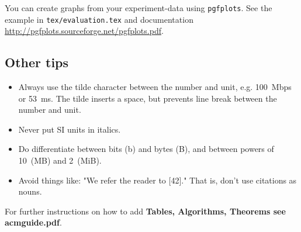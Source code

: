 You can create graphs from your experiment-data using \texttt{pgfplots}.
See the example in \texttt{tex/evaluation.tex} and documentation \url{http://pgfplots.sourceforge.net/pgfplots.pdf}.

\subsection{Other tips}
\begin{itemize}

\item Always use the tilde character between the number and unit, e.g. 100~Mbps or 53~ms. The tilde inserts a space, but prevents line break between the number and unit.

\item Never put SI units in italics. 

\item Do differentiate between bits (b) and bytes (B), and between powers of 10~(MB) and 2~(MiB).

\item Avoid things like: "We refer the reader to [42]." That is, don't use citations as nouns.
\end{itemize}

For further instructions on how to add \textbf{Tables, Algorithms, Theorems see acmguide.pdf}.
